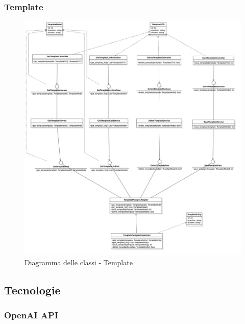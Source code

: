 \subsubsection{Template}
\begin{figure}[H]
    \centering
    \includegraphics[width=\linewidth, height=0.8\textheight, keepaspectratio]{./img/Template.png}
    \caption{Diagramma delle classi - Template}
    \label{fig:template}
\end{figure}



\subsection{Tecnologie}
\subsubsection{OpenAI API}

